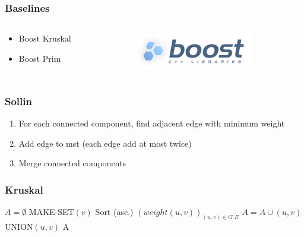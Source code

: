 \documentclass{beamer}
\begin{document}
\begin{frame}
\frametitle{Baselines}

\begin{columns}
\begin{column}{.7\linewidth}
\begin{itemize}
\item Boost Kruskal
\item Boost Prim
\end{itemize}
\end{column}

\begin{column}{.3\linewidth}
\includegraphics[width=\linewidth]{boost.png}
\end{column}
\end{columns}

\end{frame}

\begin{frame}[fragile]
\frametitle{Sollin}
\begin{enumerate}
	\item For each connected component, find adjacent edge with minimum weight
	\item Add edge to mst (each edge add at most twice)
	\item Merge connected components
\end{enumerate}
\end{frame}

\begin{frame}[fragile]
\frametitle{Kruskal}
\small
\begin{algorithm}[H]
\begin{algorithmic}[1]
\STATE $A = \emptyset$
\STATE MAKE-SET$(v)$
\ENDFOR
\STATE Sort (asc.) $\left(weight(u, v)\right)_{(u, v) \in G.E}$
\STATE $A = A \cup {(u, v)}$
\STATE UNION$(u, v)$
\ENDIF
\ENDFOR
\RETURN A
\end{algorithmic}
\end{algorithm}


\end{frame}
\end{document}
